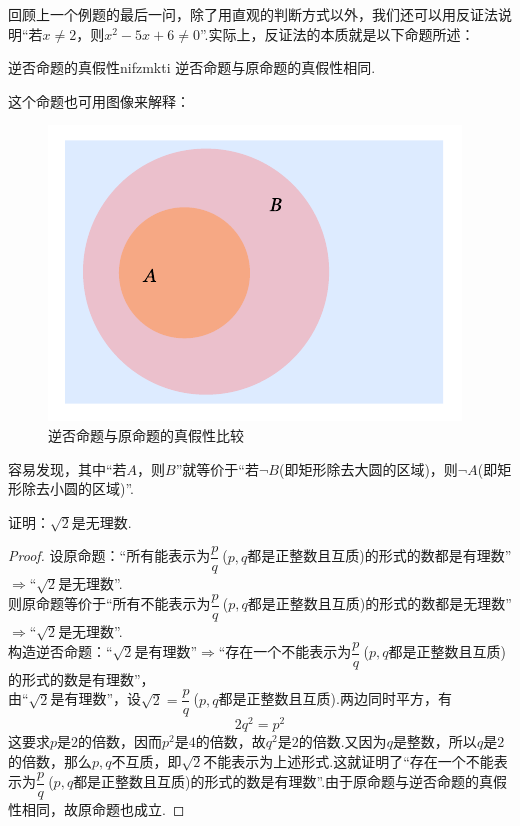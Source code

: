 \documentclass[lang=cn, zihao=5]{elegantbook}
\begin{document}
回顾上一个例题的最后一问，除了用直观的判断方式以外，我们还可以用反证法说明“若$x \neq 2$，则$x^2-5x+6 \neq 0$”.实际上，反证法的本质就是以下命题所述：

\begin{proposition}{逆否命题的真假性}{nifzmkti}
	逆否命题与原命题的真假性相同.
\end{proposition}

这个命题也可用图像来解释：

\begin{figure}[h!]
	\centering
	\includegraphics{attachment/202302192.pdf}
	\caption{逆否命题与原命题的真假性比较}
\end{figure}

容易发现，其中“若$A$，则$B$”就等价于“若$\neg B$(即矩形除去大圆的区域)，则$\neg A$(即矩形除去小圆的区域)”.




\begin{example}
	证明：$\sqrt{2}$是无理数.
\end{example}
\begin{proof}
	设原命题：“所有能表示为$\dfrac{p}{q}~$($p,q$都是正整数且互质)的形式的数都是有理数”$\Rightarrow$“$\sqrt{2}$是无理数”. \\
	则原命题等价于“所有不能表示为$\dfrac{p}{q}~$($p,q$都是正整数且互质)的形式的数都是无理数”$\Rightarrow$“$\sqrt{2}$是无理数”. \\
	构造逆否命题：“$\sqrt{2}$是有理数”$\Rightarrow$“存在一个不能表示为$\dfrac{p}{q}~$($p,q$都是正整数且互质)的形式的数是有理数”， \\
	由“$\sqrt{2}$是有理数”，设$\sqrt{2}= \dfrac{p}{q}~$($p,q$都是正整数且互质).两边同时平方，有$$2q^2=p^2$$
	这要求$p$是$2$的倍数，因而$p^2$是$4$的倍数，故$q^2$是$2$的倍数.又因为$q$是整数，所以$q$是$2$的倍数，那么$p,q$不互质，即$\sqrt{2}$不能表示为上述形式.这就证明了“存在一个不能表示为$\dfrac{p}{q}~$($p,q$都是正整数且互质)的形式的数是有理数”.由于原命题与逆否命题的真假性相同，故原命题也成立.
\end{proof}
\end{document}
